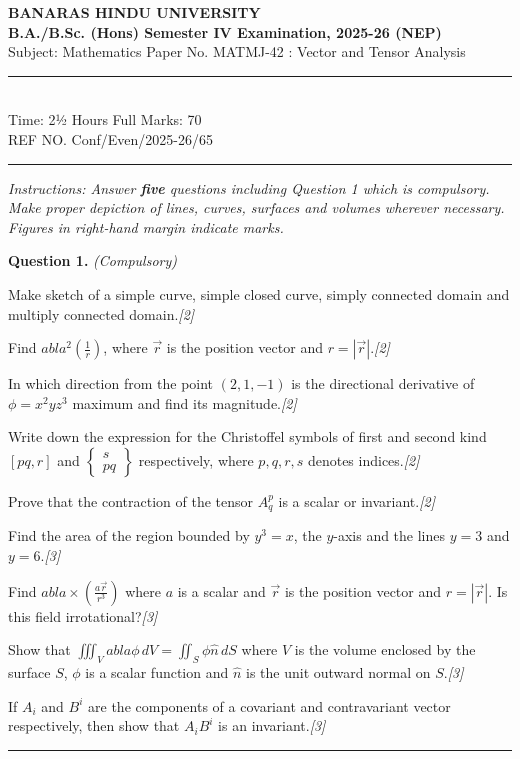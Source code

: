 \documentclass[11pt,a4paper]{article}
\newcommand{\pts}[1]{\hfill   \textit{[#1]}}
\begin{document}
\begin{center}
  {\large\bfseries BANARAS HINDU UNIVERSITY}\\[2pt]
  {\large\bfseries B.A./B.Sc. (Hons) Semester IV Examination, 2025-26 (NEP)}\\[4pt]
  {\normalsize Subject: Mathematics \hfill Paper No. MATMJ-42 : Vector and Tensor Analysis}\\[4pt]
  \rule{0.8\linewidth}{0.5pt}\\[6pt]
  {\normalsize Time: 2½ Hours \hfill Full Marks: 70}\\[2pt]
  {\small REF NO. Conf/Even/2025-26/65}
\end{center}
\rule{\linewidth}{0.4pt}
\smallskip



\noindent   \textit{Instructions: Answer   \textbf{five} questions including Question 1 which is compulsory. Make proper depiction of lines, curves, surfaces and volumes wherever necessary. Figures in right-hand margin indicate marks.}
\bigskip




\noindent   \textbf{Question 1.}   \textit{(Compulsory)}

\begin{parts}
  \item Make sketch of a simple curve, simple closed curve, simply connected domain and multiply connected domain.\pts{2}
  \item Find $
abla^2\left(\frac{1}{r}\right)$, where $\vec{r}$ is the position vector and $r=|\vec{r}|$.\pts{2}
  \item In which direction from the point $(2,1,-1)$ is the directional derivative of $\phi=x^2 y z^3$ maximum and find its magnitude.\pts{2}
  \item Write down the expression for the Christoffel symbols of first and second kind $[pq,r]$ and $
\begin{Bmatrix} s \\ pq \end{Bmatrix}$ respectively, where $p,q,r,s$ denotes indices.\pts{2}
  \item Prove that the contraction of the tensor $A^p_q$ is a scalar or invariant.\pts{2}
  \item Find the area of the region bounded by $y^3=x$, the $y$-axis and the lines $y=3$ and $y=6$.\pts{3}
  \item Find $
abla  \times \left(\frac{a\vec{r}}{r^3}\right)$ where $a$ is a scalar and $\vec{r}$ is the position vector and $r=|\vec{r}|$. Is this field irrotational?\pts{3}
  \item Show that $\iiint_V 
abla\phi \, dV = \iint_S \phi \hat{n} \, dS$ where $V$ is the volume enclosed by the surface $S$, $\phi$ is a scalar function and $\hat{n}$ is the unit outward normal on $S$.\pts{3}
  \item If $A_i$ and $B^i$ are the components of a covariant and contravariant vector respectively, then show that $A_i B^i$ is an invariant.\pts{3}
\end{parts}
\medskip\rule{\linewidth}{0.2pt}
\end{document}
